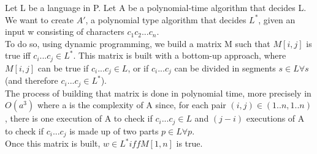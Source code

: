 
Let L be a language in P.
Let A be a polynomial-time algorithm that decides L.
We want to create $A'$, a polynomial type algorithm that decides $L^*$, given an input w consisting of characters $c_1c_2...c_n$.\\
To do so, using dynamic programming, we build a matrix M such that $M[i,j]$ is true iff $c_i...c_j \in L^*$. 
This matrix is built with a bottom-up approach, where $M[i,j]$ can be true if $c_i...c_j \in L$, or if $c_i...c_j$ can be divided in segments $s \in L \forall s$ (and therefore $c_i...c_j \in L^*$). \\
The process of building that matrix is done in polynomial time, more precisely in $O(a^3)$ where a is the complexity of A since, for each pair $(i,j) \in (1..n, 1..n)$, there is one execution of A to check if $c_i...c_j\in L$ and $(j - i)$ executions of A to check if $c_i...c_j$ is made up of two parts $p \in L  \forall p$. \\
Once this matrix is built, $w \in L^* iff M[1,n]$ is true.
